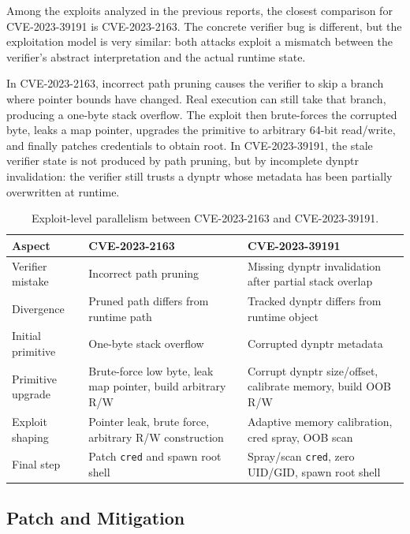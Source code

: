 \documentclass[../main.tex]{subfiles}
\begin{document}
Among the exploits analyzed in the previous reports, the closest comparison for CVE-2023-39191 is CVE-2023-2163. The concrete verifier bug is different, but the exploitation model is very similar: both attacks exploit a mismatch between the verifier's abstract interpretation and the actual runtime state.

In CVE-2023-2163, incorrect path pruning causes the verifier to skip a branch where pointer bounds have changed. Real execution can still take that branch, producing a one-byte stack overflow. The exploit then brute-forces the corrupted byte, leaks a map pointer, upgrades the primitive to arbitrary 64-bit read/write, and finally patches credentials to obtain root. In CVE-2023-39191, the stale verifier state is not produced by path pruning, but by incomplete dynptr invalidation: the verifier still trusts a dynptr whose metadata has been partially overwritten at runtime.

\begin{table}[H]
\centering
\begin{tabularx}{\textwidth}{|l|X|X|}
\hline
\textbf{Aspect} & \textbf{CVE-2023-2163} & \textbf{CVE-2023-39191} \\
\hline
Verifier mistake & Incorrect path pruning & Missing dynptr invalidation after partial stack overlap \\
\hline
Divergence & Pruned path differs from runtime path & Tracked dynptr differs from runtime object \\
\hline
Initial primitive & One-byte stack overflow & Corrupted dynptr metadata \\
\hline
Primitive upgrade & Brute-force low byte, leak map pointer, build arbitrary R/W & Corrupt dynptr size/offset, calibrate memory, build OOB R/W \\
\hline
Exploit shaping & Pointer leak, brute force, arbitrary R/W construction & Adaptive memory calibration, cred spray, OOB scan \\
\hline
Final step & Patch \texttt{cred} and spawn root shell & Spray/scan \texttt{cred}, zero UID/GID, spawn root shell \\
\hline
\end{tabularx}
\caption{Exploit-level parallelism between CVE-2023-2163 and CVE-2023-39191.}
\end{table}

\subsection{Patch and Mitigation}
\end{document}
